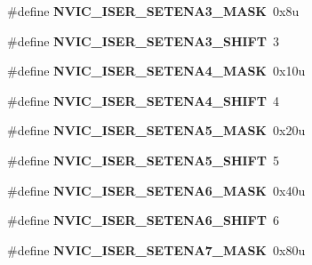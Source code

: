 \begin{DoxyCompactItemize}
\#define {\bfseries N\+V\+I\+C\+\_\+\+I\+S\+E\+R\+\_\+\+S\+E\+T\+E\+N\+A3\+\_\+\+M\+A\+SK}~0x8u
\item 
\mbox{\label{group___n_v_i_c___register___masks_ga6475b611d052df053512bd2f03995b2e}} 
\#define {\bfseries N\+V\+I\+C\+\_\+\+I\+S\+E\+R\+\_\+\+S\+E\+T\+E\+N\+A3\+\_\+\+S\+H\+I\+FT}~3
\item 
\mbox{\label{group___n_v_i_c___register___masks_gabdbd6628a7a230c8110f7d2b944e4766}} 
\#define {\bfseries N\+V\+I\+C\+\_\+\+I\+S\+E\+R\+\_\+\+S\+E\+T\+E\+N\+A4\+\_\+\+M\+A\+SK}~0x10u
\item 
\mbox{\label{group___n_v_i_c___register___masks_gaa9f4517a9e5e14414b591bf558fb892f}} 
\#define {\bfseries N\+V\+I\+C\+\_\+\+I\+S\+E\+R\+\_\+\+S\+E\+T\+E\+N\+A4\+\_\+\+S\+H\+I\+FT}~4
\item 
\mbox{\label{group___n_v_i_c___register___masks_ga7afcd583b7c3508c28361c4c1282abfa}} 
\#define {\bfseries N\+V\+I\+C\+\_\+\+I\+S\+E\+R\+\_\+\+S\+E\+T\+E\+N\+A5\+\_\+\+M\+A\+SK}~0x20u
\item 
\mbox{\label{group___n_v_i_c___register___masks_ga676fb18a5f74e3b78267ac2fff8aa500}} 
\#define {\bfseries N\+V\+I\+C\+\_\+\+I\+S\+E\+R\+\_\+\+S\+E\+T\+E\+N\+A5\+\_\+\+S\+H\+I\+FT}~5
\item 
\mbox{\label{group___n_v_i_c___register___masks_gafbd90e6755f2c0cae8e08d7f2c781146}} 
\#define {\bfseries N\+V\+I\+C\+\_\+\+I\+S\+E\+R\+\_\+\+S\+E\+T\+E\+N\+A6\+\_\+\+M\+A\+SK}~0x40u
\item 
\mbox{\label{group___n_v_i_c___register___masks_gac5598f21e8adbd9cce4ba0c67d34b6a1}} 
\#define {\bfseries N\+V\+I\+C\+\_\+\+I\+S\+E\+R\+\_\+\+S\+E\+T\+E\+N\+A6\+\_\+\+S\+H\+I\+FT}~6
\item 
\mbox{\label{group___n_v_i_c___register___masks_gaf62d5f832f14f27c961333d4dfaedca3}} 
\#define {\bfseries N\+V\+I\+C\+\_\+\+I\+S\+E\+R\+\_\+\+S\+E\+T\+E\+N\+A7\+\_\+\+M\+A\+SK}~0x80u
\item 

\end{DoxyCompactItemize}
